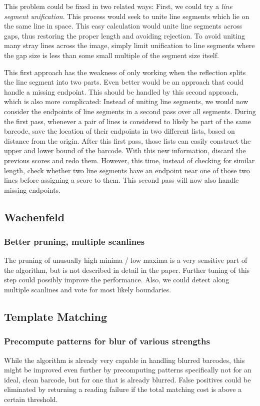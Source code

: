 This problem could be fixed in two related ways: First, we could try a \emph{line segment unification}. This process would seek to unite line segments which lie on the same line in space. This easy calculation would unite line segments across gaps, thus restoring the proper length and avoiding rejection. To avoid uniting many stray lines across the image, simply limit unification to line segments where the gap size is less than some small multiple of the segment size itself.

This first approach has the weakness of only working when the reflection splits the line segment into two parts. Even better would be an approach that could handle a missing endpoint. This should be handled by this second approach, which is also more complicated: Instead of uniting line segments, we would now consider the endpoints of line segments in a second pass over all segments. During the first pass, whenever a pair of lines is considered to likely be part of the same barcode, save the location of their endpoints in two different lists, based on distance from the origin. After this first pass, those lists can easily construct the upper and lower bound of the barcode. With this new information, discard the previous scores and redo them. However, this time, instead of checking for similar length, check whether two line segments have an endpoint near one of those two lines before assigning a score to them. This second pass will now also handle missing endpoints.

\subsection{Wachenfeld}
\subsubsection*{Better pruning, multiple scanlines}
The pruning of unusually high minima / low maxima is a very sensitive part of
the algorithm, but is not described in detail in the paper. Further tuning of
this step could possibly improve the performance.
Also, we could detect along multiple scanlines and vote for most likely boundaries.

\subsection{Template Matching}
\subsubsection*{Precompute patterns for blur of various strengths}

While the algorithm is already very capable in handling blurred barcodes, this might be improved even further by precomputing patterns specifically not for an ideal, clean barcode, but for one that is already blurred.
False positives could be eliminated by returning a reading failure if the
total matching cost is above a certain threshold.

